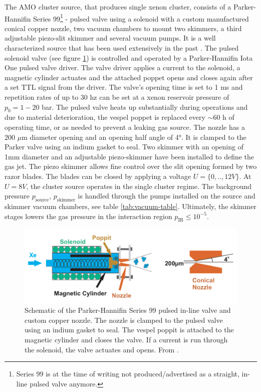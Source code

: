 The AMO cluster source, that produces single xenon cluster, consists of a Parker-Hannifin Series 99\footnote{Series 99 is at the time of writing not produced/advertised as a straight, in-line pulsed valve anymore.} - pulsed valve using a solenoid with a custom manufactured conical copper nozzle, two vacuum chambers to mount two skimmers, a third adjustable piezo-slit skimmer and several vacuum pumps. It is a well characterized source that has been used extensively in the past \citep{Ferguson-2016-SciAdv,Ferguson-2015-JSR,Gorkhover-2012-PRL,Gorkhover-2016-NatPho,Rupp-2014-JCP}. The pulsed solenoid valve (see figure \ref{fig:parker-valve}) is controlled and operated by a Parker-Hannifin Iota One pulsed valve driver. The valve driver applies a current to the solenoid, a magnetic cylinder actuates and the attached poppet opens and closes again after a set TTL signal from the driver. The valve's opening time is set to 1 ms and repetition rates of up to $30$ hz can be set at a xenon reservoir pressure of $p_{0}=1-20$ bar. The pulsed valve heats up substantially during operations and due to material deterioration, the vespel poppet is replaced every $\sim 60$ h of operating time, or as needed to prevent a leaking gas source. The nozzle has a 200 $\mu$m diameter opening and an opening half angle of 4°. It is clamped to the Parker valve using an indium gasket to seal. Two skimmer with an opening of 1mm diameter and an adjustable piezo-skimmer have been installed to define the gas jet. The piezo skimmer allows fine control over the slit opening formed by two razor blades. The blades can be closed by applying a voltage $U=\{0,..,12V\}$. At $U=8V$, the cluster source operates in the single cluster regime. The background pressure $p_{\text{source}}$, $p_{\text{skimmer}}$ is handled through the pumps installed on the source and skimmer vacuum chambers, see table \ref{tab:vacuum-table}. Ultimately, the skimmer stages lowers the gas pressure in the interaction region $p_{\text{IR}}\leq 10^{-5}$.\\
\begin{figure}
	\centering
		\includegraphics[width=1.00\textwidth]{images/parker-valve.png}
	\caption[Schematic of the Parker-Hannifin Series 99 valve.]{Schematic of the Parker-Hannifin Series 99 pulsed in-line valve and custom copper nozzle. The nozzle is clamped to the pulsed valve using an indium gasket to seal. The vespel poppit is attached to the magnetic cylinder and closes the valve. If a current is run through the solenoid, the valve actuates and opens. From \citep{Ferguson-2016-PhD}.}
	\label{fig:parker-valve}
\end{figure}
